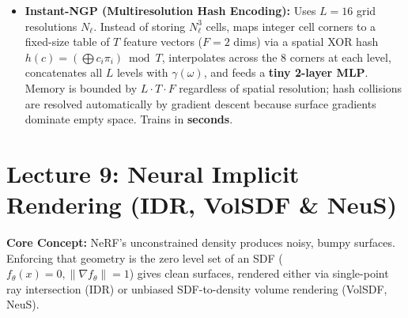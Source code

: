 \documentclass[11pt,a4paper]{article}
\theoremstyle{definition}
\theoremstyle{plain}
\theoremstyle{remark}
\begin{document}
\begin{itemize}
\begin{itemize}
        \item \textbf{Instant-NGP (Multiresolution Hash Encoding):} Uses $L=16$ grid resolutions $N_\ell$. Instead of storing $N_\ell^3$ cells, maps integer cell corners to a fixed-size table of $T$ feature vectors ($F=2$ dims) via a spatial XOR hash $h(c) = (\bigoplus c_i\pi_i) \bmod T$, interpolates across the 8 corners at each level, concatenates all $L$ levels with $\gamma(\omega)$, and feeds a \textbf{tiny 2-layer MLP}. Memory is bounded by $L\cdot T\cdot F$ regardless of spatial resolution; hash collisions are resolved automatically by gradient descent because surface gradients dominate empty space. Trains in \textbf{seconds}.
    \end{itemize}
\end{itemize}

\hr
\section*{\textcolor{primary}{Lecture 9: Neural Implicit Rendering (IDR, VolSDF \& NeuS)}}
\textbf{Core Concept:} NeRF's unconstrained density produces noisy, bumpy surfaces. Enforcing that geometry is the zero level set of an SDF ($f_\theta(x)=0, \|\nabla f_\theta\|=1$) gives clean surfaces, rendered either via single-point ray intersection (IDR) or unbiased SDF-to-density volume rendering (VolSDF, NeuS).
\end{document}
